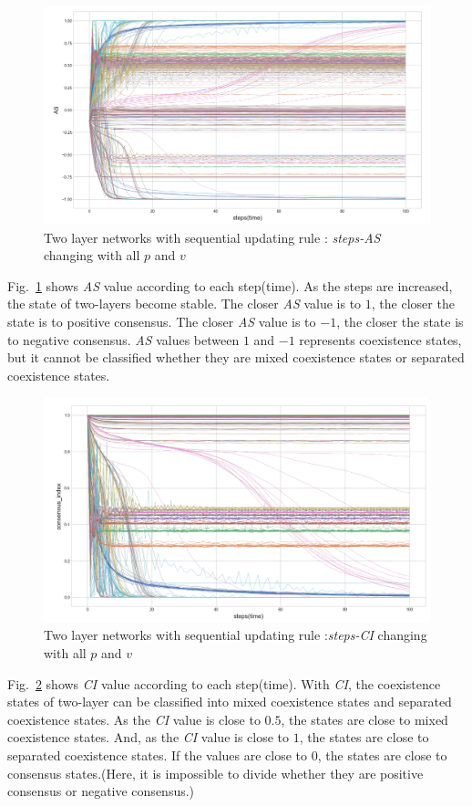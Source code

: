 \begin{figure}[!htb]
	\centering
	\includegraphics[width=\hsize]{figure/timeflow_AS.png}
	\caption{Two layer networks with sequential updating rule : \textit{steps-AS} changing with all $p$ and $v$}
	\label{timeflow_AS}
\end{figure}

Fig.~\ref{timeflow_AS} shows \textit{AS} value according to each step(time). As the steps are increased, the state of two-layers become stable. The closer \textit{AS} value is to $1$, the closer the state is to positive consensus. The closer \textit{AS} value is to $-1$, the closer the state is to negative consensus. \textit{AS} values between $1$ and $-1$ represents coexistence states, but it cannot be classified whether they are mixed coexistence states or separated coexistence states.
\begin{figure}[!htb]
	\centering
	\includegraphics[width=\hsize]{figure/timeflow_CI.png}
	\caption{Two layer networks with sequential updating rule :\textit{steps-CI} changing with all $p$ and $v$}
	\label{timeflow_CI}
\end{figure}
Fig.~\ref{timeflow_CI} shows \textit{CI} value according to each step(time). With \textit{CI}, the coexistence states of two-layer can be classified into mixed coexistence states and separated coexistence states. As the \textit{CI} value is close to $0.5$, the states are close to mixed coexistence states. And, as the \textit{CI} value is close to $1$, the states are close to separated coexistence states. If the values are close to $0$, the states are close to consensus states.(Here, it is impossible to divide whether they are positive consensus or negative consensus.)           

